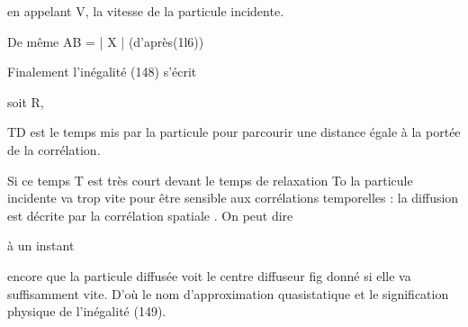 en appelant V, la vitesse de la particule incidente.

De même AB = | X | (d'après(1l6))

Finalement l'inégalité (148) s'écrit

soit R,

TD est le temps mis par la particule pour parcourir une distance égale à la
portée de la corrélation.

Si ce temps T est très court devant le temps de relaxation To la particule
incidente va trop vite pour être sensible aux corrélations temporelles : la
diffusion est décrite par la corrélation spatiale . On peut dire

 à un instant

encore que la particule diffusée voit le centre diffuseur fig
donné si elle va suffisamment vite. D'où le nom d'approximation quasistatique
et le signification physique de l'inégalité (149).

